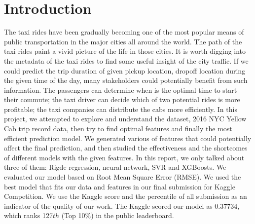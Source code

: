 \section{Introduction}
The taxi rides have been gradually becoming one of the most popular means of public transportation in the major cities all around the world. The path of the taxi rides paint a vivid picture of the life in those cities. It is worth digging into the metadata of the taxi rides to find some useful insight of the city traffic. If we could predict the trip duration of given pickup location, dropoff location during the given time of the day, many stakeholders could potentially benefit from such information. The passengers can determine when is the optimal time to start their commute; the taxi driver can decide which of two potential rides is more profitable; the taxi companies can distribute the cabs more efficiently. 
In this project, we attempted to explore and understand the dataset, 2016 NYC Yellow Cab trip record data, then try to find optimal features and finally the most efficient prediction model. We generated various of features that could potentially affect the final prediction, and then studied the effectiveness and the shortcomes of different models with the given features. In this report, we only talked about three of them: Rigde-regression, neural network, SVR and XGBoosts.   
We evaluated our model based on Root Mean Square Error (RMSE). We used the best model that fits our data and features in our final submission for Kaggle Competition. We use the Kaggle score and the percentile of all submission as an indicator of the quality of our work. The Kaggle scored our model as 0.37734, which ranks 127$th$ (Top 10\%) in the public leaderboard.


